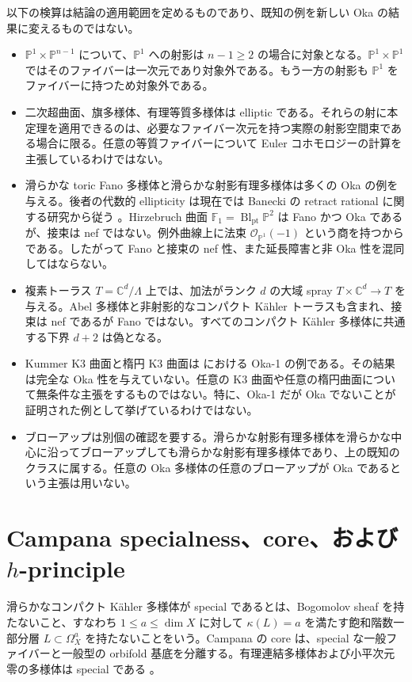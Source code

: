 \documentclass[12pt]{amsart}
\theoremstyle{definition}
\theoremstyle{remark}
\numberwithin{equation}{section}
\newcommand{\cO}{\mathcal{O}}
\newcommand{\C}{\mathbb{C}}
\newcommand{\mP}{\mathbb{P}}
\begin{document}
以下の検算は結論の適用範囲を定めるものであり、既知の例を新しい Oka の結果に変えるものではない。
\begin{itemize}
\item $\mP^1\times\mP^{n-1}$ について、$\mP^1$ への射影は $n-1\geq2$ の場合に対象となる。$\mP^1\times\mP^1$ ではそのファイバーは一次元であり対象外である。もう一方の射影も $\mP^1$ をファイバーに持つため対象外である。
\item 二次超曲面、旗多様体、有理等質多様体は elliptic である。それらの射に本定理を適用できるのは、必要なファイバー次元を持つ実際の射影空間束である場合に限る。任意の等質ファイバーについて Euler コホモロジーの計算を主張しているわけではない。
\item 滑らかな toric Fano 多様体と滑らかな射影有理多様体は多くの Oka の例を与える。後者の代数的 ellipticity は現在では Banecki の retract rational に関する研究から従う \cite{ja:Banecki}。Hirzebruch 曲面 $\mathbb F_1=\operatorname{Bl}_{\mathrm{pt}}\mP^2$ は Fano かつ Oka であるが、接束は nef ではない。例外曲線上に法束 $\cO_{\mP^1}(-1)$ という商を持つからである。したがって Fano と接束の nef 性、また延長障害と非 Oka 性を混同してはならない。
\item 複素トーラス $T=\C^d/\Lambda$ 上では、加法がランク $d$ の大域 spray $T\times\C^d\to T$ を与える。Abel 多様体と非射影的なコンパクト K\"ahler トーラスも含まれ、接束は nef であるが Fano ではない。すべてのコンパクト K\"ahler 多様体に共通する下界 $d+2$ は偽となる。
\item Kummer K3 曲面と楕円 K3 曲面は \cite{ja:AF} における Oka-1 の例である。その結果は完全な Oka 性を与えていない。任意の K3 曲面や任意の楕円曲面について無条件な主張をするものではない。特に、Oka-1 だが Oka でないことが証明された例として挙げているわけではない。
\item ブローアップは別個の確認を要する。滑らかな射影有理多様体を滑らかな中心に沿ってブローアップしても滑らかな射影有理多様体であり、上の既知のクラスに属する。任意の Oka 多様体の任意のブローアップが Oka であるという主張は用いない。
\end{itemize}

\section{Campana specialness、core、および \texorpdfstring{$h$}{h}-principle}
滑らかなコンパクト K\"ahler 多様体が special であるとは、Bogomolov sheaf を持たないこと、すなわち $1\leq a\leq\dim X$ に対して $\kappa(L)=a$ を満たす飽和階数一部分層 $L\subset\Omega_X^a$ を持たないことをいう。Campana の core は、special な一般ファイバーと一般型の orbifold 基底を分離する。有理連結多様体および小平次元零の多様体は special である \cite{ja:Campana}。
\end{document}
